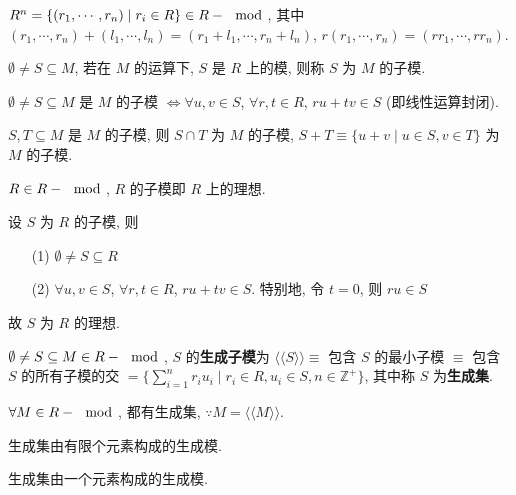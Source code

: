 \documentclass{note}
\begin{document}
\begin{eg}
    $R^n=\{(r_1,\cdots,r_n)\mid r_i\in R\}\in R-\mod$, 其中 $(r_1,\cdots,r_n)+(l_1,\cdots,l_n)=(r_1+l_1,\cdots,r_n+l_n)$, $r(r_1,\cdots,r_n)=(rr_1,\cdots,rr_n)$.
\end{eg}

\begin{df}[子模]
    $\emptyset\neq S\subseteq M$, 若在 $M$ 的运算下, $S$ 是 $R$ 上的模, 则称 $S$ 为 $M$ 的子模.
\end{df}

\begin{thm}
    $\emptyset\neq S\subseteq M$ 是 $M$ 的子模 $\Longleftrightarrow\forall u,v\in S$, $\forall r,t\in R$, $ru+tv\in S$ (即线性运算封闭).
\end{thm}

\begin{thm}[(课本定理 4.2)]
    $S,T\subseteq M$ 是 $M$ 的子模, 则 $S\cap T$ 为 $M$ 的子模, $S+T\equiv\{u+v\mid u\in S,v\in T\}$ 为 $M$ 的子模.
\end{thm}

\begin{thm}
    $R\in R-\mod $, $R$ 的子模即 $R$ 上的理想.
\end{thm}
\begin{pf}
    设 $S$ 为 $R$ 的子模, 则
    \begin{itemize}
        \item[(1)] $\emptyset\neq S\subseteq R$
        \item[(2)] $\forall u,v\in S$, $\forall r,t\in R$, $ru+tv\in S$. 特别地, 令 $t=0$, 则 $ru\in S$
    \end{itemize}
    故 $S$ 为 $R$ 的理想.
\end{pf}

\begin{df}[生成子模和生成集]
    $\emptyset\neq S\subseteq M\in R-\mod$, $S$ 的\textbf{生成子模}为 $\langle\langle S\rangle\rangle\equiv$ 包含 $S$ 的最小子模 $\equiv$ 包含 $S$ 的所有子模的交 $=\{\sum_{i=1}^nr_iu_i\mid r_i\in R,u_i\in S,n\in\mathbb{Z}^+\}$, 其中称 $S$ 为\textbf{生成集}.
\end{df}

$\forall M\in R-\mod$, 都有生成集, $\because M=\langle\langle M\rangle\rangle$.

\begin{df}[有限生成模]
    生成集由有限个元素构成的生成模.
\end{df}

\begin{df}[循环模]
    生成集由一个元素构成的生成模.
\end{df}
\end{document}
